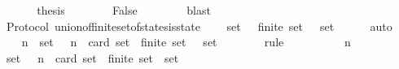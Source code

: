 \begin{isabellebody}
\isanewline
\ \ \ \ \isamarkupfalse%
\ \isamarkupfalse%
\ {\isacharquery}thesis\isanewline
\ \ \ \ \ \ \isamarkupfalse%
\ False\ {\isacartoucheopen}{\isasymsigma}{}\ {\isasymin}\ {\isasymSigma}{\isacartoucheclose}\ {\isacartoucheopen}{\isasymsigma}{}\ {\isasymin}\ {\isasymSigma}{\isacartoucheclose}\ \isamarkupfalse%
\ blast\isanewline
\ \ \isamarkupfalse%
\isanewline
{}\isamarkupfalse%
%
\endisatagproof
{\isafoldproof}%
%
\isadelimproof
\isanewline
%
\endisadelimproof
\isanewline
{}\isamarkupfalse%
\ {\isacharparenleft}\ Protocol{\isacharparenright}\ union{\isacharunderscore}of{\isacharunderscore}finite{\isacharunderscore}set{\isacharunderscore}of{\isacharunderscore}states{\isacharunderscore}is{\isacharunderscore}state\ {\isacharcolon}\isanewline
\ \ {\isachardoublequoteopen}{\isasymforall}\ {\isasymsigma}{\isacharunderscore}set\ {\isasymsubseteq}\ {\isasymSigma}{\isachardot}\ finite\ {\isasymsigma}{\isacharunderscore}set\ {\isasymlongrightarrow}\ {\isasymUnion}\ {\isasymsigma}{\isacharunderscore}set\ {\isasymin}\ {\isasymSigma}{\isachardoublequoteclose}\isanewline
%
\isadelimproof
\ \ %
\endisadelimproof
%
\isatagproof
{}\isamarkupfalse%
\ auto\isanewline
{}\isamarkupfalse%
\ {\isacharminus}\isanewline
\ \ \isamarkupfalse%
\ {\isachardoublequoteopen}{\isasymforall}\ n{\isachardot}\ {\isasymforall}\ {\isasymsigma}{\isacharunderscore}set\ {\isasymsubseteq}\ {\isasymSigma}{\isachardot}\ n\ {\isacharequal}\ card\ {\isasymsigma}{\isacharunderscore}set\ {\isasymlongrightarrow}\ finite\ {\isasymsigma}{\isacharunderscore}set\ {\isasymlongrightarrow}\ {\isasymUnion}\ {\isasymsigma}{\isacharunderscore}set\ {\isasymin}\ {\isasymSigma}{\isachardoublequoteclose}\isanewline
\ \ \ \ \isamarkupfalse%
\ {\isacharparenleft}rule{\isacharparenright}\isanewline
\ \ \isamarkupfalse%
\ {\isacharminus}\isanewline
\ \ \ \ \isamarkupfalse%
\ n\isanewline
\ \ \ \ \isamarkupfalse%
\ {\isachardoublequoteopen}{\isasymforall}\ {\isasymsigma}{\isacharunderscore}set\ {\isasymsubseteq}\ {\isasymSigma}{\isachardot}\ n\ {\isacharequal}\ card\ {\isasymsigma}{\isacharunderscore}set\ {\isasymlongrightarrow}\ finite\ {\isasymsigma}{\isacharunderscore}set\ {\isasymlongrightarrow}\ {\isasymUnion}{\isasymsigma}{\isacharunderscore}set\ {\isasymin}\ {\isasymSigma}{\isachardoublequoteclose}\isanewline
\ \ \ \ \ \ \isamarkupfalse%

\end{isabellebody}
